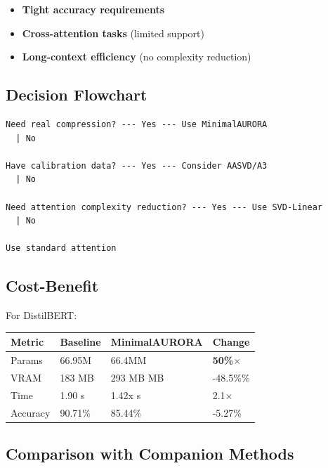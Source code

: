 \begin{itemize}
\item \textbf{Tight accuracy requirements}
\item \textbf{Cross-attention tasks} (limited support)
\item \textbf{Long-context efficiency} (no complexity reduction)

\end{itemize}
\subsection{Decision Flowchart}

\begin{lstlisting}
Need real compression? --- Yes --- Use MinimalAURORA
  | No
   
Have calibration data? --- Yes --- Consider AASVD/A3
  | No
   
Need attention complexity reduction? --- Yes --- Use SVD-Linear
  | No
   
Use standard attention
\end{lstlisting}

\subsection{Cost-Benefit}

For DistilBERT:

\begin{table}[H]
\centering
\small
\begin{tabular}{llll}
\toprule
\textbf{Metric} & \textbf{Baseline} & \textbf{MinimalAURORA} & \textbf{Change} \\
\midrule
Params & 66.95M & 66.4MM & \textbf{50\%$\times$} \\
VRAM & 183 MB & 293 MB MB & -48.5\%\% \\
Time & 1.90 s & 1.42x s & 2.1$\times$ \\
Accuracy & 90.71\% & 85.44\% & -5.27\% \\
\bottomrule
\end{tabular}
\end{table}

\subsection{Comparison with Companion Methods}

